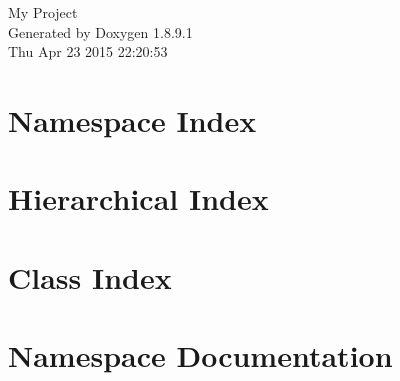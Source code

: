 \documentclass[twoside]{book}
\newcommand{\+}{\discretionary{\mbox{\scriptsize$\hookleftarrow$}}{}{}}
\newcommand{\clearemptydoublepage}{%
  \newpage{\pagestyle{empty}\cleardoublepage}%
}
\begin{document}
\hypersetup{pageanchor=false,
             bookmarks=true,
             bookmarksnumbered=true,
             pdfencoding=unicode
            }
\begin{titlepage}
\vspace*{7cm}
\begin{center}%
{\Large My Project }\\
\vspace*{1cm}
{\large Generated by Doxygen 1.8.9.1}\\
\vspace*{0.5cm}
{\small Thu Apr 23 2015 22:20:53}\\
\end{center}
\end{titlepage}
\clearemptydoublepage
\tableofcontents
\clearemptydoublepage
{}
\hypersetup{pageanchor=true}

\chapter{Namespace Index}

\chapter{Hierarchical Index}

\chapter{Class Index}

\chapter{Namespace Documentation}



\end{document}
